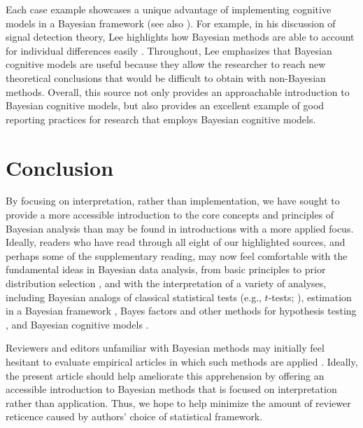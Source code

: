 Each case example showcases a unique advantage of implementing cognitive models in a Bayesian framework (see also ). For example, in his discussion of signal detection theory, Lee highlights how Bayesian methods are able to account for individual differences easily \cite<see also>[in the \textit{Further reading} appendix]{rouder2005introduction}. Throughout, Lee emphasizes that Bayesian cognitive models are useful because they allow the researcher to reach new theoretical conclusions that would be difficult to obtain with non-Bayesian methods. Overall, this source not only provides an approachable introduction to Bayesian cognitive models, but also provides an excellent example of good reporting practices for research that employs Bayesian cognitive models.  

\section{Conclusion}
By focusing on interpretation, rather than implementation, we have sought to provide a more accessible introduction to the core concepts and principles of Bayesian analysis than may be found in introductions with a more applied focus.  Ideally, readers who have read through all eight of our highlighted sources, and perhaps some of the supplementary reading, may now feel comfortable with the fundamental ideas in Bayesian data analysis, from basic principles \cite{Kruschke2015doing,Lindley1993} to prior distribution selection \cite{leeVanpaemel2016}, and with the interpretation of a variety of analyses, including Bayesian analogs of classical statistical tests (e.g., $t$-tests; ), estimation in a Bayesian framework \cite{schoot2014}, Bayes factors and other methods for hypothesis testing \cite{Dienes2011,vandekerckhove2015model}, and Bayesian cognitive models \cite{lee2008}. 

Reviewers and editors unfamiliar with Bayesian methods may initially feel hesitant to evaluate empirical articles in which such methods are applied \cite{LoveSI}.  
Ideally, the present article should help ameliorate this apprehension by offering an accessible introduction to Bayesian methods that is focused on interpretation rather than application. Thus, we hope to help minimize the amount of reviewer reticence caused by authors' choice of statistical framework. 

